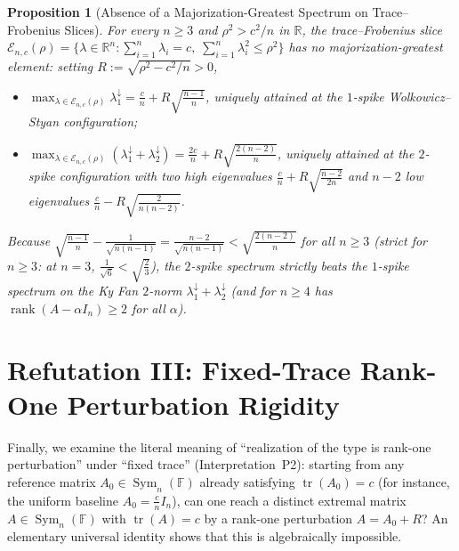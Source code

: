 \documentclass[11pt]{article}
\newtheorem{proposition}[theorem]{Proposition}
\theoremstyle{definition}
\theoremstyle{remark}
\newcommand{\tr}{\operatorname{tr}}
\newcommand{\rk}{\operatorname{rank}}
\newcommand{\Sym}{\operatorname{Sym}}
\begin{document}
\begin{proposition}[Absence of a Majorization-Greatest Spectrum on Trace--Frobenius Slices]
\label{prop:ellipsoid}
For every $n \ge 3$ and $\rho^2 > c^2 / n$ in $\mathbb{R}$, the trace--Frobenius slice $\mathcal{E}_{n,c}(\rho) = \{\lambda \in \mathbb{R}^n : \sum_{i=1}^n \lambda_i = c,\; \sum_{i=1}^n \lambda_i^2 \le \rho^2\}$ has \emph{no} majorization-greatest element: setting $R := \sqrt{\rho^2 - c^2/n} > 0$,
\begin{itemize}
  \item $\max_{\lambda \in \mathcal{E}_{n,c}(\rho)} \lambda_1^\downarrow = \frac{c}{n} + R\sqrt{\frac{n-1}{n}}$, uniquely attained at the $1$-spike Wolkowicz--Styan configuration;
  \item $\max_{\lambda \in \mathcal{E}_{n,c}(\rho)} (\lambda_1^\downarrow + \lambda_2^\downarrow) = \frac{2c}{n} + R\sqrt{\frac{2(n-2)}{n}}$, uniquely attained at the $2$-spike configuration with two high eigenvalues $\frac{c}{n} + R\sqrt{\frac{n-2}{2n}}$ and $n-2$ low eigenvalues $\frac{c}{n} - R\sqrt{\frac{2}{n(n-2)}}$.
\end{itemize}
Because $\sqrt{\frac{n-1}{n}} - \frac{1}{\sqrt{n(n-1)}} = \frac{n-2}{\sqrt{n(n-1)}} < \sqrt{\frac{2(n-2)}{n}}$ for all $n \ge 3$ (strict for $n \ge 3$: at $n = 3$, $\frac{1}{\sqrt{6}} < \sqrt{\frac{2}{3}}$), the $2$-spike spectrum strictly beats the $1$-spike spectrum on the Ky Fan $2$-norm $\lambda_1^\downarrow + \lambda_2^\downarrow$ (and for $n \ge 4$ has $\rk(A - \alpha I_n) \ge 2$ for all $\alpha$).
\end{proposition}

\section{Refutation III: Fixed-Trace Rank-One Perturbation Rigidity}
\label{sec:r3}

Finally, we examine the literal meaning of ``realization of the type is rank-one perturbation'' under ``fixed trace'' (Interpretation~P2): starting from any reference matrix $A_0 \in \Sym_n(\mathbb{F})$ already satisfying $\tr(A_0) = c$ (for instance, the uniform baseline $A_0 = \frac{c}{n} I_n$), can one reach a distinct extremal matrix $A \in \Sym_n(\mathbb{F})$ with $\tr(A) = c$ by a rank-one perturbation $A = A_0 + R$? An elementary universal identity shows that this is algebraically impossible.
\end{document}
